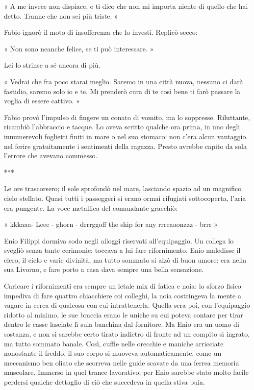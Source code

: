 « A me invece non dispiace, e ti dico che non mi importa niente di quello che hai detto. Tranne che non sei più triste. »

Fabio ignorò il moto di insofferenza che lo investì. Replicò secco:

« Non sono neanche felice, se ti può interessare. »

Lei lo strinse a sé ancora di più.

« Vedrai che fra poco starai meglio. Saremo in una città nuova, nessuno ci darà fastidio, saremo solo io e te. Mi prenderò cura di te così bene ti farò passare la voglia di essere cattivo. »

Fabio provò l'impulso di fingere un conato di vomito, ma lo soppresse. Riluttante, ricambiò l'abbraccio e tacque. Lo aveva scritto qualche ora prima, in uno degli innumerevoli foglietti finiti in mare o nel suo stomaco: non c'era alcun vantaggio nel ferire gratuitamente i sentimenti della ragazza. Presto avrebbe capito da sola l'errore che avevano commesso.

***

Le ore trascorsero; il sole sprofondò nel mare, lasciando spazio ad un magnifico cielo stellato. Quasi tutti i passeggeri si erano ormai rifugiati sottocoperta, l'aria era pungente. La voce metallica del comandante gracchiò:

« kkkaaa- Leee - ghorn - drrrggoff the ship for any rrreaaonzzz - brrr »

Enio Filippi dormiva sodo negli alloggi riservati all'equipaggio. Un collega lo svegliò senza tante cerimonie: toccava a lui fare rifornimento. Enio maledisse il clero, il cielo e varie divinità, ma tutto sommato si alzò di buon umore: era nella sua Livorno, e fare porto a casa dava sempre una bella sensazione.

Caricare i rifornimenti era sempre un letale mix di fatica e noia: lo sforzo fisico impediva di fare quattro chiacchiere coi colleghi, la noia costringeva la mente a vagare in cerca di qualcosa con cui intrattenerla. Quella sera poi, con l'equipaggio ridotto al minimo, le sue braccia erano le uniche su cui poteva contare per tirar dentro le casse lasciate lì sula banchina dal fornitore. Ma Enio era un uomo di sostanza, e non si sarebbe certo tirato indietro di fronte ad un compito sì ingrato, ma tutto sommato banale. Così, cuffie nelle orecchie e maniche arricciate nonostante il freddo, il suo corpo si muoveva automaticamente, come un meccanismo ben oliato che scorreva nelle guide scavate da una ferrea memoria muscolare. Immerso in quel trance lavorativo, per Enio sarebbe stato molto facile perdersi qualche dettaglio di ciò che succedeva in quella stiva buia.


